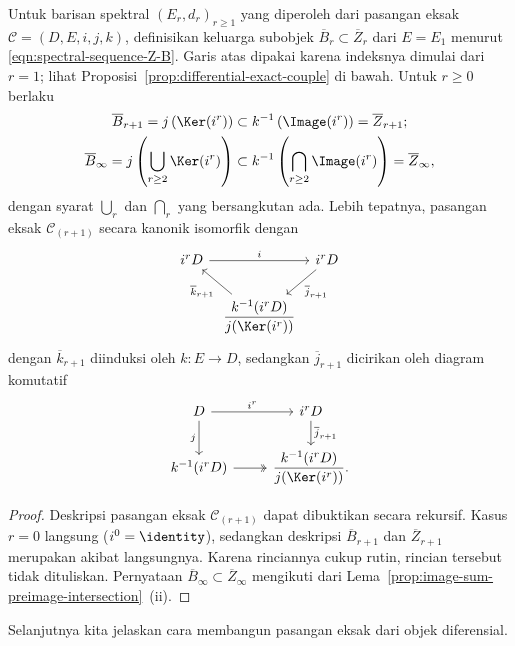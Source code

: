 \begin{lemma}\label{prop:exact-couple-Z-B}
	Untuk barisan spektral $(E_r,d_r)_{r\geq1}$ yang diperoleh dari pasangan
	eksak $\mathscr{C}=(D,E,i,j,k)$, definisikan keluarga subobjek
	$\overline{B}_r\subset\overline{Z}_r$ dari $E=E_1$ menurut
	\eqref{eqn:spectral-sequence-Z-B}. Garis atas dipakai karena indeksnya
	dimulai dari $r=1$; lihat Proposisi~\ref{prop:differential-exact-couple} di
	bawah. Untuk $r\geq0$ berlaku
	\begin{gather*}
		\overline{B}_{r+1}=j\left(\Ker(i^r)\right)
		\subset k^{-1}\left(\Image(i^r)\right)=\overline{Z}_{r+1}; \\
		\overline{B}_\infty=j\left(\bigcup_{r\geq2}\Ker(i^r)\right)
		\subset k^{-1}\left(\bigcap_{r\geq2}\Image(i^r)\right)
		=\overline{Z}_\infty,
	\end{gather*}
	dengan syarat $\bigcup_r$ dan $\bigcap_r$ yang bersangkutan ada. Lebih
	tepatnya, pasangan eksak $\mathscr{C}_{(r+1)}$ secara kanonik isomorfik
	dengan
	\[\begin{tikzcd}[column sep=tiny]
		i^rD \arrow[rr, "i"] & & i^rD \arrow[ld, "{\overline{j}_{r+1}}"] \\
		& \dfrac{k^{-1}(i^rD)}{j(\Ker(i^r))}
		\arrow[lu, "{\overline{k}_{r+1}}"] &
	\end{tikzcd}\]
	dengan $\overline{k}_{r+1}$ diinduksi oleh $k:E\to D$, sedangkan
	$\overline{j}_{r+1}$ dicirikan oleh diagram komutatif
	\[\begin{tikzcd}
		D \arrow[r, "{i^r}"] \arrow[d, "j"'] &
		i^rD \arrow[d, "{\overline{j}_{r+1}}"] \\
		k^{-1}(i^rD) \arrow[twoheadrightarrow, r] &
		\dfrac{k^{-1}(i^rD)}{j(\Ker(i^r))}.
	\end{tikzcd}\]
\end{lemma}
\begin{proof}
	Deskripsi pasangan eksak $\mathscr{C}_{(r+1)}$ dapat dibuktikan secara
	rekursif. Kasus $r=0$ langsung ($i^0=\identity$), sedangkan
	deskripsi $\overline{B}_{r+1}$ dan $\overline{Z}_{r+1}$ merupakan akibat
	langsungnya. Karena rinciannya cukup rutin, rincian tersebut tidak dituliskan.
	Pernyataan $\overline{B}_\infty\subset\overline{Z}_\infty$ mengikuti dari
	Lema~\ref{prop:image-sum-preimage-intersection}~(ii).
\end{proof}

Selanjutnya kita jelaskan cara membangun pasangan eksak dari objek diferensial.

